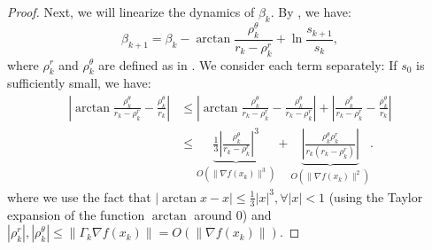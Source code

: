\documentclass{article}
\theoremstyle{plain}
\theoremstyle{definition}
\theoremstyle{remark}
\begin{document}
\begin{proof}
    Next, we will linearize the dynamics of $\beta_k$. By , we have:
    \begin{equation*}
        \beta_{k + 1} = \beta_k - \arctan \frac{\rho_k^\theta}{r_k - \rho^r_k} + \ln \frac{s_{k+1}}{s_{k}},
    \end{equation*}
    where $\rho_k^r$ and $\rho_k^\theta$ are defined as in . We consider each term separately: If $s_0$ is sufficiently small, we have:
    \begin{equation*}
        \begin{aligned}
            \left|\arctan \frac{\rho_k^\theta}{r_k - \rho^r_k} - \frac{\rho_k^\theta}{r_k}\right| & \leq \left|\arctan \frac{\rho_k^\theta}{r_k - \rho^r_k} - \frac{\rho_k^\theta}{r_k - \rho^r_k}\right| + \left|\frac{\rho_k^\theta}{r_k - \rho^r_k} - \frac{\rho_k^\theta}{r_k}\right|\\
            &\leq \underbrace{\frac{1}{3}\left|\frac{\rho_k^\theta}{r_k - \rho^r_k}\right|^3}_{O(\|\nabla f(x_k)\|^3)} + \underbrace{\left|\frac{\rho_k^\theta\rho_k^r}{r_k(r_k - \rho^r_k)}\right|}_{O(\|\nabla f(x_k)\|^2)}.
        \end{aligned}
    \end{equation*}
    where we use the fact that $|\arctan x - x| \leq \frac{1}{3}|x|^3, \forall |x| < 1$ (using the Taylor expansion of the function $\arctan$ around $0$) and $|\rho_k^r|, |\rho_k^\theta| \leq \|\Gamma_k \nabla f(x_k)\| = O(\|\nabla f(x_k)\|)$.


\end{proof}
\end{document}
